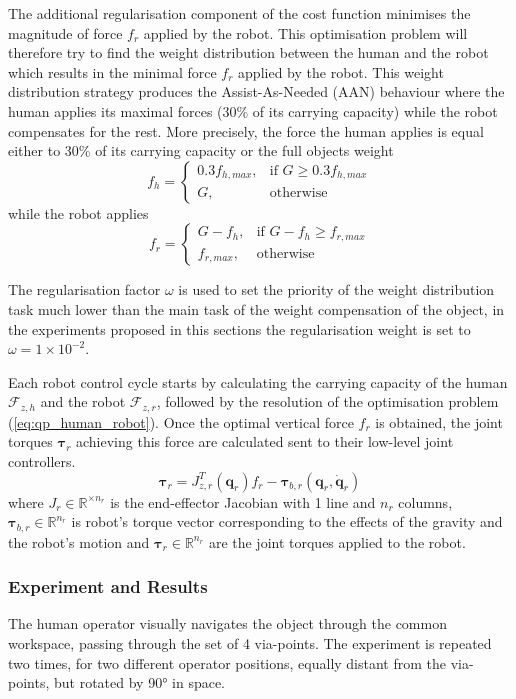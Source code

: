 The additional regularisation component of the cost function minimises the magnitude of force $f_{r}$ applied by the robot. This optimisation problem will therefore try to find the weight distribution between the human and the robot which results in the minimal force $f_{r}$ applied by the robot. This weight distribution strategy produces the Assist-As-Needed (AAN) behaviour where the human applies its maximal forces (30\% of its carrying capacity) while the robot compensates for the rest. More precisely, the force the human applies is equal either to 30\% of its carrying capacity or the full objects weight
$$
f_h = \begin{cases}
    0.3f_{h,max},& \text{if } G\geq 0.3f_{h,max}\\
    G,              & \text{otherwise}
\end{cases}
$$
while the robot applies
$$
f_r =  \begin{cases}
    G-f_h,& \text{if } G-f_h\geq f_{r,max}\\
    f_{r,max},              & \text{otherwise}
\end{cases}
$$

The regularisation factor $\omega$ is used to set the priority of the weight distribution task much lower than the main task of the weight compensation of the object, in the experiments proposed in this sections the regularisation weight is set to $\omega=1\times 10^{-2}$.

Each robot control cycle starts by calculating the carrying capacity of the human $\mathcal{F}_{z,h}$ and the robot $\mathcal{F}_{z,r}$, followed by the resolution of the optimisation problem (\ref{eq:qp_human_robot}). Once the optimal vertical force $f_{r}$ is obtained, the joint torques $\bm{\tau}_{r}$ achieving this force are calculated sent to their low-level joint controllers. 
$$
\bm{\tau}_r = J_{z,r}^T(\bm{q}_r) f_r - \bm{\tau}_{b,r}(\bm{q}_r,\dot{\bm{q}}_r)
$$
where $J_r\in\mathbb{R}^{\times n_r}$ is the end-effector Jacobian with 1 line and $n_r$ columns, $\bm{\tau}_{b,r} \in\mathbb{R}^{n_r}$ is robot's torque vector corresponding to the effects of the gravity and the robot's motion and $\bm{\tau}_r \in\mathbb{R}^{n_r}$ are the joint torques applied to the robot. 

\subsubsection{Experiment and Results}
\label{sec:human_robot_experiment}
The human operator {visually} navigates the object through the common workspace, passing through {the set of} 4 via-points. 
{The experiment is repeated two times, for two different operator positions, equally distant from the via-points, but rotated by 90° in space.}

